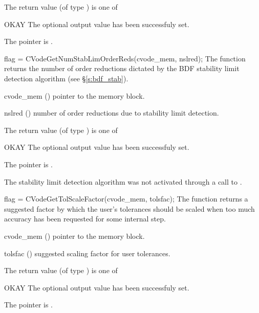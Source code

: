 {
  The return value  (of type ) is one of
  \begin{args}
  \item[OKAY] 
    The optional output value has been successfuly set.
  \item[\Id{CVG\_NO\_MEM}]
    The  pointer is .
  \end{args}
}
{}
{
  flag = CVodeGetNumStabLimOrderReds(cvode\_mem, nslred);
}
{
  The function  returns the
  number of order reductions dictated by the BDF stability limit 
  detection algorithm (see \S\ref{s:bdf_stab}).
}
{
  \begin{args}
  \item[cvode\_mem] ()
    pointer to the {\cvode} memory block.
  \item[nslred] ()
    number of order reductions due to stability limit detection.
  \end{args}
}
{
  The return value  (of type ) is one of
  \begin{args}
  \item[OKAY] 
    The optional output value has been successfuly set.
  \item[\Id{CVG\_NO\_MEM}]
    The  pointer is .
  \item[\Id{CVG\_NO\_SLDET}]
    The stability limit detection algorithm was not activated 
    through a call to .
  \end{args}
}
{}
{
  flag = CVodeGetTolScaleFactor(cvode\_mem, tolsfac);
}
{
  The function  returns a
  suggested factor by which the user's tolerances 
  should be scaled when too much accuracy has been 
  requested for some internal step.
}
{
  \begin{args}
  \item[cvode\_mem] ()
    pointer to the {\cvode} memory block.
  \item[tolsfac] ()
    suggested scaling factor for user tolerances.
  \end{args}
}
{
  The return value  (of type ) is one of
  \begin{args}
  \item[OKAY] 
    The optional output value has been successfuly set.
  \item[\Id{CVG\_NO\_MEM}]
    The  pointer is .
  \end{args}
}

